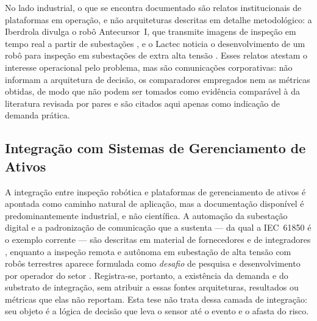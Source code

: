 No lado industrial, o que se encontra documentado são relatos institucionais de
plataformas em operação, e não arquiteturas descritas em detalhe metodológico: a
Iberdrola divulga o robô Antecursor~I, que transmite imagens de inspeção em tempo real
a partir de subestações \cite{Iberdrola2022}, e o Lactec noticia o desenvolvimento de
um robô para inspeção em subestações de extra alta tensão \cite{Lactec2022}. Esses
relatos atestam o interesse operacional pelo problema, mas são comunicações
corporativas: não informam a arquitetura de decisão, os comparadores empregados nem as
métricas obtidas, de modo que não podem ser tomados como evidência comparável à da
literatura revisada por pares e são citados aqui apenas como indicação de demanda
prática.

\subsection{Integração com Sistemas de Gerenciamento de Ativos}

A integração entre inspeção robótica e plataformas de gerenciamento de ativos é
apontada como caminho natural de aplicação, mas a documentação disponível é
predominantemente industrial, e não científica. A automação da subestação digital e a
padronização de comunicação que a sustenta --- da qual a IEC~61850 é o exemplo
corrente --- são descritas em material de fornecedores e de integradores
\cite{Clouglobal2024,Selinc2024}, enquanto a inspeção remota e autônoma em subestação
de alta tensão com robôs terrestres aparece formulada como \emph{desafio} de pesquisa
e desenvolvimento por operador do setor \cite{Eletrobras2024}. Registra-se, portanto,
a existência da demanda e do substrato de integração, sem atribuir a essas fontes
arquiteturas, resultados ou métricas que elas não reportam. Esta tese não trata dessa
camada de integração: seu objeto é a lógica de decisão que leva o sensor até o evento
e o afasta do risco.

